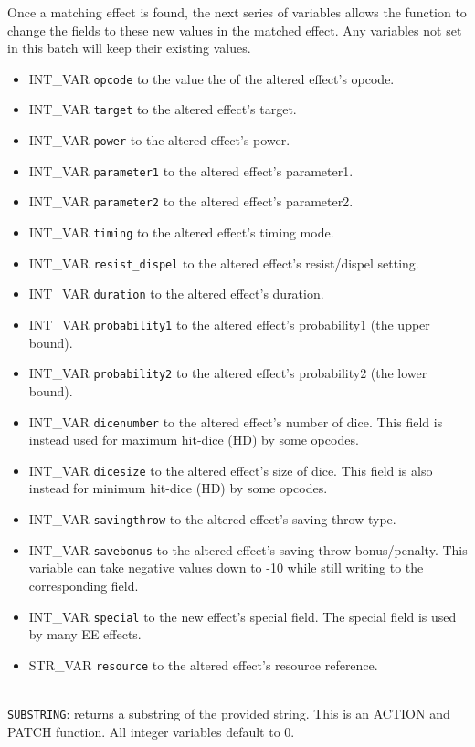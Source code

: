 \documentclass{article}
\begin{document}
Once a matching effect is found, the next series of variables allows the function to change the fields to these new values in the matched effect. Any variables not set in this batch will keep their existing values.

\begin{itemize}
\item INT_VAR \verb+opcode+ to the value the of the altered effect's opcode.
\item INT_VAR \verb+target+ to the altered effect's target.
\item INT_VAR \verb+power+ to the altered effect's power.
\item INT_VAR \verb+parameter1+ to the altered effect's parameter1.
\item INT_VAR \verb+parameter2+ to the altered effect's parameter2.
\item INT_VAR \verb+timing+ to the altered effect's timing mode.
\item INT_VAR \verb+resist_dispel+ to the altered effect's resist/dispel setting.
\item INT_VAR \verb+duration+ to the altered effect's duration.
\item INT_VAR \verb+probability1+ to the altered effect's probability1 (the upper bound).
\item INT_VAR \verb+probability2+ to the altered effect's probability2 (the lower bound).
\item INT_VAR \verb+dicenumber+ to the altered effect's number of dice. This field is instead used for maximum hit-dice (HD) by some opcodes.
\item INT_VAR \verb+dicesize+ to the altered effect's size of dice. This field is also instead for minimum hit-dice (HD) by some opcodes.
\item INT_VAR \verb+savingthrow+ to the altered effect's saving-throw type.
\item INT_VAR \verb+savebonus+ to the altered effect's saving-throw bonus/penalty. This variable can take negative values down to -10 while still writing to the corresponding field.
\item INT_VAR \verb+special+ to the new effect's special field. The special field is used by many EE effects.
\item STR_VAR \verb+resource+ to the altered effect's resource reference.
\end{itemize}
\\

\verb+SUBSTRING+: returns a substring of the provided string. This is an ACTION and PATCH function. All integer variables default to 0.
\end{document}
